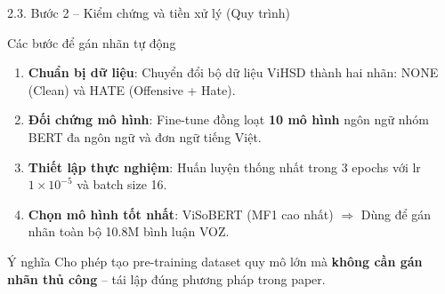 \documentclass[11pt, aspectratio=169]{beamer}
\begin{document}
\begin{frame}[shrink=5]{2.3. Bước 2 -- Kiểm chứng và tiền xử lý (Quy trình)}

\begin{block}{Các bước để gán nhãn tự động}
  \begin{enumerate}
    \item \textbf{Chuẩn bị dữ liệu}: Chuyển đổi bộ dữ liệu ViHSD thành hai nhãn: NONE (Clean) và HATE (Offensive + Hate).
    \item \textbf{Đối chứng mô hình}: Fine-tune đồng loạt \textbf{10 mô hình} ngôn ngữ nhóm BERT đa ngôn ngữ và đơn ngữ tiếng Việt.
    \item \textbf{Thiết lập thực nghiệm}: Huấn luyện thống nhất trong 3 epochs với lr $1 \times 10^{-5}$ và batch size 16.
    \item \textbf{Chọn mô hình tốt nhất}: ViSoBERT (MF1 cao nhất) $\Rightarrow$ Dùng để gán nhãn toàn bộ 10.8M bình luận VOZ.
  \end{enumerate}
\end{block}

\vspace{0.2cm}
\begin{block}{Ý nghĩa}
  Cho phép tạo pre-training dataset quy mô lớn mà \textbf{không cần gán nhãn thủ công} -- tái lập đúng phương pháp trong paper.
\end{block}
\end{frame}
\end{document}
